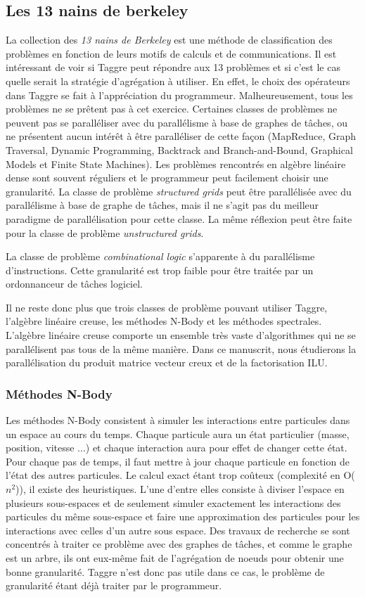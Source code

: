 \subsection{Les 13 nains de berkeley}
La collection des {\em 13 nains de Berkeley}\cite{dwarfs} est une méthode de classification des problèmes en fonction de leurs motifs de calculs et de communications.
%
Il est intéressant de voir si Taggre peut répondre aux 13 problèmes et si c'est le cas quelle serait la stratégie d'agrégation à utiliser.
%
En effet, le choix des opérateurs dans Taggre se fait à l'appréciation du programmeur.
%
Malheureusement, tous les problèmes ne se prêtent pas à cet exercice.
%
Certaines classes de problèmes ne peuvent pas se paralléliser avec du parallélisme à base de graphes de tâches, ou ne présentent aucun intérêt à être paralléliser de cette façon (MapReduce, Graph Traversal, Dynamic Programming, Backtrack and Branch-and-Bound, Graphical Models et Finite State Machines).
%
Les problèmes rencontrés en algèbre linéaire dense sont souvent réguliers et le programmeur peut facilement choisir une granularité.
%
La classe de problème {\em structured grids} peut être parallélisée avec du parallélisme à base de graphe de tâches, mais il ne s'agit pas du meilleur paradigme de parallélisation pour cette classe.
%
La même réflexion peut être faite pour la classe de problème {\em unstructured grids}.


La classe de problème {\em combinational logic} s'apparente à du parallélisme d'instructions.
%
Cette granularité est trop faible pour être traitée par un ordonnanceur de tâches logiciel.

Il ne reste donc plus que trois classes de problème pouvant utiliser Taggre, l'algèbre linéaire creuse, les méthodes N-Body et les méthodes spectrales.
%
L'algèbre linéaire creuse comporte un ensemble très vaste d'algorithmes qui ne se parallélisent pas tous de la même manière.
%
Dans ce manuscrit, nous étudierons la parallélisation du produit matrice vecteur creux et de la factorisation ILU.


\subsubsection{Méthodes N-Body}
Les méthodes N-Body consistent à simuler les interactions entre particules dans un espace au cours du temps.
%
Chaque particule aura un état particulier (masse, position, vitesse ...) et chaque interaction aura pour effet de changer cette état.
%
Pour chaque pas de temps, il faut mettre à jour chaque particule en fonction de l'état des autres particules.
%
Le calcul exact étant trop coûteux (complexité en O($n^2$)), il existe des heuristiques.
%
L'une d'entre elles consiste à diviser l'espace en plusieurs sous-espaces et de seulement simuler exactement les interactions des particules du même sous-espace et faire une approximation des particules pour les interactions avec celles d'un autre sous espace.
%
Des travaux de recherche se sont concentrés à traiter ce problème avec des graphes de tâches\cite{scalfmm}, et comme le graphe est un arbre, ils ont eux-même fait de l'agrégation de noeuds pour obtenir une bonne granularité.
%
Taggre n'est donc pas utile dans ce cas, le problème de granularité étant déjà traiter par le programmeur.


